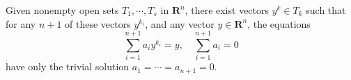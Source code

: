Given nonempty open sets $T_1, \cdots, T_s$ in $\mathbf{R}^n$, there exist vectors $y^k \in T_k$ such that for any $n+1$ of these vectors $y^{k_i}$, and any vector $y \in \mathbf{R}^n$, the equations
$$\sum_{i=1}^{n+1} a_i y^{k_i} = y, \quad \sum_{i=1}^{n+1} a_i = 0$$
have only the trivial solution $a_1 = \cdots = a_{n+1} = 0$.

